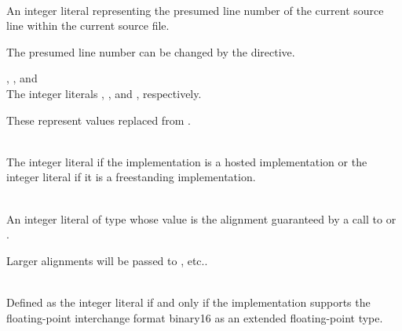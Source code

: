 \begin{description}
\item
{}%
\\
An integer literal representing the presumed line number of
the current source line within the current source file.
\begin{note}
The presumed line number can be changed by the  directive.
\end{note}

\item
{}%
%
%
, , and \\
The integer literals , , and , respectively.
\begin{note}
These represent values replaced from .
\end{note}

\item
{}%
%
%
\\
The integer literal 
if the implementation is a hosted implementation or
the integer literal 
if it is a freestanding implementation.

\item
{}%
\\
An integer literal of type 
whose value is the alignment guaranteed
by a call to 
or .
\begin{note}
Larger alignments will be passed to
, etc..
\end{note}

\item
{}%
\\
Defined as the integer literal 
if and only if the implementation supports
the \IsoFloatUndated{} floating-point interchange format binary16
as an extended floating-point type.


\end{description}
